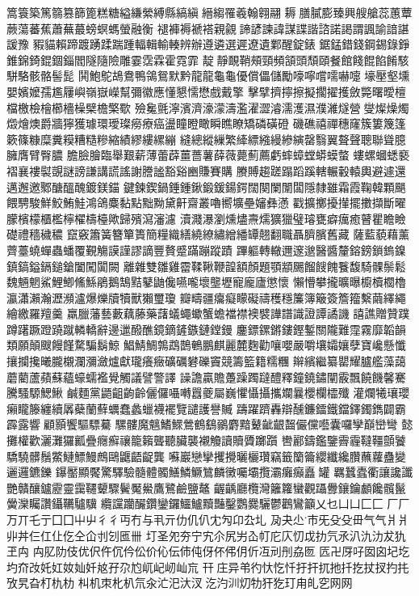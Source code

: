 篙簑築篤篛篡篩篦糕糖縊縑縈縛縣縞縝縉縐罹羲翰翱翮
耨膳膩膨臻興艘艙蕊蕙蕈蕨蕩蕃蕉蕭蕪蕞螃螟螞螢融衡
褪褲褥褫褡親覦諦諺諫諱謀諜諧諮諾謁謂諷諭諳諶諼豫
豭貓賴蹄踱踴蹂踹踵輻輯輸輳辨辦遵遴選遲遼遺鄴醒錠錶
鋸錳錯錢鋼錫錄錚錐錦錡錕錮錙閻隧隨險雕霎霑霖霍霓霏
靛靜靦鞘頰頸頻頷頭頹頤餐館餞餛餡餚駭駢駱骸骼髻髭
鬨鮑鴕鴣鴦鴨鴒鴛默黔龍⿓龜⿔優償儡儲勵嚎嚀嚐嚅嚇嚏
壕壓壑壎嬰嬪嬤孺尷屨嶼嶺嶽嶸幫彌徽應懂懇懦懋戲戴擎
擊擘擠擰擦擬擱擢擭斂斃曙曖檀檔檄檢檜櫛檣橾檗檐檠歜
殮毚氈濘濱濟濠濛濤濫濯澀濬濡濩濕濮濰燧營燮燦燥燭
燬燴燠爵牆獰獲璩環璦璨癆療癌盪瞳瞪瞰瞬瞧瞭矯磷磺磴
磯礁禧禪穗窿簇簍篾篷簌篠糠糜糞糢糟糙糝縮績繆縷縲繃
縫總縱繅繁縴縹繈縵縿縯罄翳翼聱聲聰聯聳臆臃膺臂臀膿
膽臉膾臨舉艱薪薄蕾薜薑薔薯薛薇薨薊薦虧蟀蟑螳蟒蟆螫
螻螺蟈蟋褻褶襄褸褽覬謎謗謙講謊謠謝謄謐豁谿豳賺賽購
賸賻趨蹉蹋蹈蹊轄輾轂轅輿避遽還邁邂邀鄹醣醞醜鍍鎂錨
鍵鍊鍥鍋錘鍾鍬鍛鍰鍚鍔闊闋闌闈闆隱隸雖霜霞鞠韓顆颶
餵騁駿鮮鮫鮪鮭鴻鴿麋黏點黜黝黛鼾齋叢嚕嚮壙壘嬸彝懣
戳擴擲擾攆擺擻擷斷曜朦檳檬櫃檻檸櫂檮檯歟歸殯瀉瀋濾
瀆濺瀑瀏燻燼燾燸獷獵璧璿甕癖癘癒瞽瞿瞻瞼礎禮穡穢穠
竄竅簫簧簪簞簣簡糧織繕繞繚繡繒繙罈翹翻職聶臍臏舊藏
薩藍藐藉薰薺薹蟯蟬蟲蟠覆覲觴謨謹謬謫豐贅蹙蹣蹦蹤蹟
蹕軀轉轍邇邃邈醫醬釐鎔鎊鎖鎢鎳鎮鎬鎰鎘鎚鎗闔闖闐闕
離雜雙雛雞霤鞣鞦鞭韹額顏題顎顓颺餾餿餽餮馥騎髁鬃鬆
魏魎魍鯊鯉鯽鯈鯀鵑鵝鵠黠鼕鼬儳嚥嚨壞壟壢寵龐廬懲懷
懶懵攀攏曠曝櫥櫝櫚櫓瀛瀟瀨瀚瀝瀕瀘爆爍牘犢獸獺璽瓊
瓣疇疆癟癡矇礙禱穫穩簾簿簸簽簷籀繫繭繹繩繪繳羅羶羹
羸臘藩藝藪藕藤藥藷蟻蠅蠍蟹蟾襠襟襖襞譁譜識證譚譎譏
譆譙贈贊蹼蹲躇蹶蹬蹺蹴轔轎辭邊邋醱醮鏡鏑鏟鏃鏈鏜鏝
鏖鏢鏍鏘鏤鏗鏨關隴難霪霧靡韜韻類願顛颼饅饉騖騙鬍鯨
鯧鯖鯛鶉鵡鵲鵪鵬麒麗麓麴勸嚷嚶嚴嚼壤孀孃孽寶巉懸懺
攘攔攙曦朧櫬瀾瀰瀲爐獻瓏癢癥礦礪礬礫竇競籌籃籍糯糰
辮繽繼纂罌耀臚艦藻藹蘑藺蘆蘋蘇蘊蠔蠕襤覺觸議譬警譯
譟譫贏贍躉躁躅躂醴釋鐘鐃鏽闡霰飄饒饑馨騫騰騷騵鰓鰍
鹹麵黨鼯齟齣齡儷儸囁囀囂夔屬巍懼懾攝攜斕曩櫻欄櫺殲
灌爛犧瓖瓔癩矓籐纏續羼蘗蘭蘚蠣蠢蠡蠟襪襬覽譴護譽贓
躊躍躋轟辯醺鐮鐳鐵鐺鐸鐲鐫闢霸霹露響顧顥饗驅驃驀
騾髏魔魑鰭鰥鶯鶴鷂鶸麝黯鼙齜齦齧儼儻囈囊囉孿巔巒彎
懿攤權歡灑灘玀瓤疊癮癬禳籠籟聾聽臟襲襯觼讀贖贗躑躓
轡酈鑄鑑鑒霽霾韃韁顫饕驕驍髒鬚鱉鰱鰾鰻鷓鷗鼴齬齪龔
囌巖戀攣攫攪曬欐瓚竊籤籣籥纓纖纔臢蘸蘿蠱變邐邏鑣鑠
鑤靨顯饜驚驛驗髓體髑鱔鱗鱖鷥麟黴囑壩攬灞癱癲矗罐
羈蠶蠹衢讓讒讖艷贛釀鑪靂靈靄韆顰驟鬢魘鱟鷹鷺鹼鹽鼇
齷齲廳欖灣籬籮蠻觀躡釁鑲鑰顱饞髖鬣黌灤矚讚鑷韉驢驥
纜讜躪釅鑽鑾鑼鱷鱸黷豔鑿鸚爨驪鬱鸛鸞籲乂乜⼐凵⼕匚
⼚厂万丌乇亍⼞囗⼬屮⼻彳丏冇与丮亓仂仉仈冘勼卬厹圠
夃夬尐巿旡⽎殳毌⽓气⽙爿丱丼仨仜仩仡仝仚刌刉匜卌
圢圣夗夯宁宄尒尻屴屳帄庀庂忉戉扐氕氶汃氿氻犮犰玊⽱
禸肊阞伎优伬仵伔仱伀价伈伝伂伅伢伓伄仴伒冱刓刐劦匢
匟卍厊吇囡囟圮圪圴夼妀奼妅奻奾奷奿孖尕尥屼屺屻屾巟
幵庄异弚彴忕忔忏扜扞扤扡扦扢扙扠扚扥攷旯旮朾朹朸
朻机朿朼朳氘汆汒汜汏汊汔汋汌灱牞犴犵玎甪癿穵⽹网
